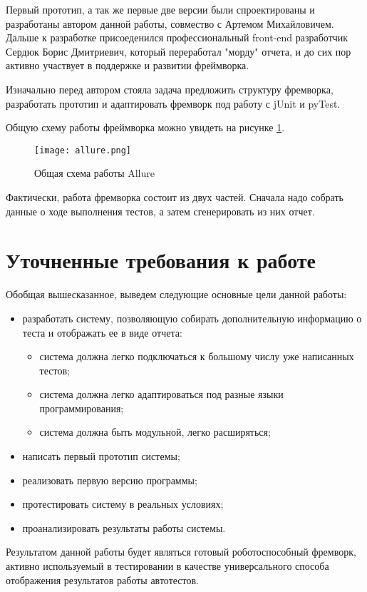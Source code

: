 Первый прототип, а так же первые две версии были спроектированы и разработаны автором данной работы, совмество с Артемом Михайловичем. Дальше к разработке присоеденился профессиональный front-end разработчик Сердюк Борис Дмитриевич, который переработал "морду" отчета, и до сих пор активно участвует в поддержке и развитии фреймворка. 

Изначально перед автором стояла задача предложить структуру фремворка, разработать прототип и адаптировать фремворк под работу с jUnit и pyTest. 

Общую схему работы фреймворка можно увидеть на рисунке \ref{fig:allure}.

\begin{figure}[htb]
\centering
\texttt{[image: allure.png]}
\caption{Общая схема работы Allure}
\label{fig:allure}
\end{figure}

Фактически, работа фремворка состоит из двух частей. Сначала надо собрать данные о ходе выполнения тестов, а затем сгенерировать из них отчет. 

\section{Уточненные требования к работе}

Обобщая вышесказанное, выведем следующие основные цели данной работы:

\begin{itemize}
\item разработать систему, позволяющую собирать дополнительную информацию о теста и отображать ее в виде отчета:
\begin{itemize}
\item система должна легко подключаться к большому числу уже написанных тестов;
\item система должна легко адаптироваться под разные языки программирования;
\item система должна быть модульной, легко расширяться;
\end{itemize}
\item написать первый прототип системы;
\item реализовать первую версию программы;
\item протестировать систему в реальных условиях;
\item проанализировать результаты работы системы.
\end{itemize}

Результатом данной работы будет являться готовый роботоспособный фремворк, активно используемый в тестировании в качестве универсального способа
отображения результатов работы автотестов.